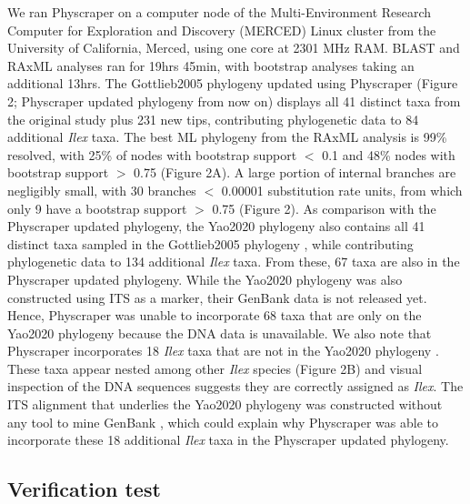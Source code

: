 \documentclass{bmcart}
\begin{document}
We ran Physcraper on a computer node of the Multi-Environment Research Computer for
Exploration and Discovery (MERCED) Linux cluster from the University of California,
Merced, using one core at 2301 MHz RAM. BLAST and RAxML analyses ran for 19hrs 45min, with bootstrap
analyses taking an additional 13hrs.
The Gottlieb2005 phylogeny \cite{gottlieb2005molecular} updated using Physcraper (Figure 2;
Physcraper updated phylogeny from now on) displays all 41 distinct
taxa from the original study plus 231 new tips, contributing phylogenetic data to
84 additional \textit{Ilex} taxa. The best ML phylogeny from the RAxML analysis is 99\%
resolved, with 25\% of nodes with bootstrap support $<$ 0.1 and 48\% nodes with
bootstrap support $>$ 0.75 (Figure 2A).
A large portion of internal branches are negligibly small, with 30 branches
$<$ 0.00001 substitution rate units, from which only 9 have a bootstrap support $>$ 0.75
(Figure 2).
As comparison with the Physcraper updated phylogeny, the Yao2020 phylogeny \cite{yao2020phylogeny}
also contains all 41 distinct taxa
sampled in the Gottlieb2005 phylogeny \cite{gottlieb2005molecular},
while contributing phylogenetic data to 134 additional \textit{Ilex} taxa. From these,
67 taxa are also in the Physcraper updated phylogeny.
While the Yao2020 phylogeny \cite{yao2020phylogeny} was also constructed using
ITS as a marker, their GenBank data is not released yet. Hence, Physcraper was unable
to incorporate 68 taxa that are only on the Yao2020 phylogeny because the DNA data is unavailable.
We also note that Physcraper incorporates 18 \textit{Ilex} taxa that are not in the Yao2020
phylogeny \cite{yao2020phylogeny}. These taxa appear nested among other \textit{Ilex}
species (Figure 2B) and visual inspection of the DNA sequences suggests they are
correctly assigned as \textit{Ilex}.
The ITS alignment that underlies the Yao2020 phylogeny was constructed without any tool to
mine GenBank \cite{yao2020phylogeny}, which could explain why Physcraper was able to
incorporate these 18 additional \textit{Ilex} taxa in the Physcraper updated phylogeny.


\subsection*{Verification test}
\end{document}
